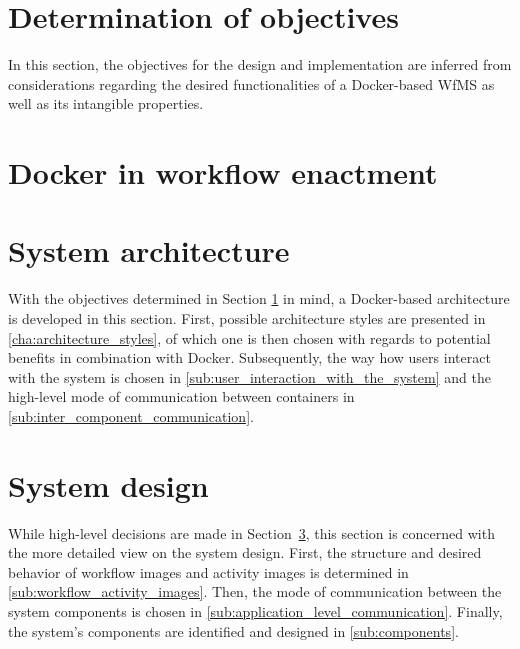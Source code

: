 \documentclass[language=english,noinputenc]{wiwwuwordrprt}
\begin{document}
    \section{Determination of objectives} %
      \label{sec:determination_of_objectives}

      In this section, the objectives for the design and implementation are inferred from considerations regarding the desired functionalities of a Docker-based \ac{WfMS} as well as its intangible properties.

      

    \section{Docker in workflow enactment} %
      \label{sec:docker_for_wf_execution}
      

    \section{System architecture} %
      \label{sec:architecture}

      With the objectives determined in Section \ref{sec:determination_of_objectives} in mind, a Docker-based architecture is developed in this section. First, possible architecture styles are presented in \ref{cha:architecture_styles}, of which one is then chosen with regards to potential benefits in combination with Docker. Subsequently, the way how users interact with the system is chosen in \ref{sub:user_interaction_with_the_system} and the high-level mode of communication between containers in \ref{sub:inter_component_communication}.

      

    \section{System design} %
      \label{sec:design}

      While high-level decisions are made in Section~\ref{sec:architecture}, this section is concerned with the more detailed view on the system design.
      First, the structure and desired behavior of workflow images and activity images is determined in \ref{sub:workflow_activity_images}. Then, the mode of communication between the system components is chosen in \ref{sub:application_level_communication}. Finally, the system's components are identified and designed in \ref{sub:components}.
\end{document}
